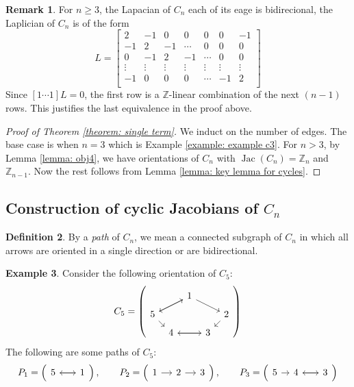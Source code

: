 \documentclass[11pt,reqno]{amsart}
\DeclareMathOperator{\Jac}{Jac}
\newcommand{\Z}{\mathbb{Z}}
\theoremstyle{definition}
\newtheorem{mydef}{Definition}[section]
\newtheorem{myeg}[mydef]{Example}
\newtheorem{rmk}[mydef]{Remark}
\theoremstyle{plain}
\begin{document}
\begin{rmk} \label{remark: obj2}
For $n \ge 3$, the Lapacian of $C_n$ each of its eage is bidirecional, the Laplician of $C_n$ is of the form 
$$
L = 
\begin{bmatrix}
2 & -1 & 0 & 0 & 0 & 0 & -1   \\
-1 & 2 & -1 & \cdots & 0 & 0 & 0 \\
0 & -1 & 2 & -1 & \cdots & 0 & 0  \\
\vdots & \vdots & \vdots & \vdots & \vdots & \vdots & \vdots  \\
-1 & 0 & 0 & 0 & \cdots & -1 & 2 \\
\end{bmatrix}
$$
Since $[1 \cdots 1] L = 0$, 
the first row is a $\Z$-linear combination of the next $(n-1)$ rows. 
This justifies the last equivalence in the proof above.  
\end{rmk}

\begin{proof}[Proof of Theorem \ref{theorem: single term}]
We induct on the number of edges. The base case is when $n = 3$ which is Example \ref{example: example c3}. For $n > 3$, by Lemma \ref{lemma: obj4}, we have orientations of $C_n$ with $\Jac(C_n) = \mathbb{Z}_n$ and $\mathbb{Z}_{n-1}$. 
Now the rest follows from Lemma \ref{lemma: key lemma for cycles}.
\end{proof}



\subsection{Construction of cyclic Jacobians of $C_n$}


\begin{mydef}
By a \textit{path} of $C_n$, we mean a connected subgraph of $C_n$ in which all arrows are oriented in a single direction or are bidirectional. 
\end{mydef}

\begin{myeg}
Consider the following orientation of $C_5$:
\[
C_5=\left( \begin{tikzcd}[row sep=0.2cm, column sep=0.2cm]
	& & 1 \arrow[drr] \arrow[dll]& &  \\ 
	5 \arrow[urr] \arrow[dr] & & & & 2 \arrow[dl] \\ 
	& 4\arrow[rr] & & 3 \arrow[ll]& 
\end{tikzcd} \right)
\]	
The following are some paths of $C_5$:
\[
P_1=\left( \begin{tikzcd}[row sep=0.3cm, column sep=0.3cm]
5 \arrow[rr] &  &1 \arrow[ll]
\end{tikzcd}\right), \qquad P_2=\left( \begin{tikzcd}[row sep=0.4cm, column sep=0.4cm]
1 \arrow[r] & 2 \arrow[r] &3 
\end{tikzcd}\right), \qquad P_3=\left( \begin{tikzcd}[row sep=0.3cm, column sep=0.3cm]
5 \arrow[r] & 4 \arrow[rr] &  &3 \arrow[ll]
\end{tikzcd}\right)
\]
\end{myeg}
\end{document}
